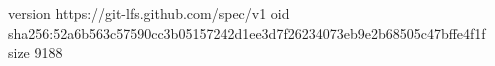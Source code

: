 version https://git-lfs.github.com/spec/v1
oid sha256:52a6b563c57590cc3b05157242d1ee3d7f26234073eb9e2b68505c47bffe4f1f
size 9188
